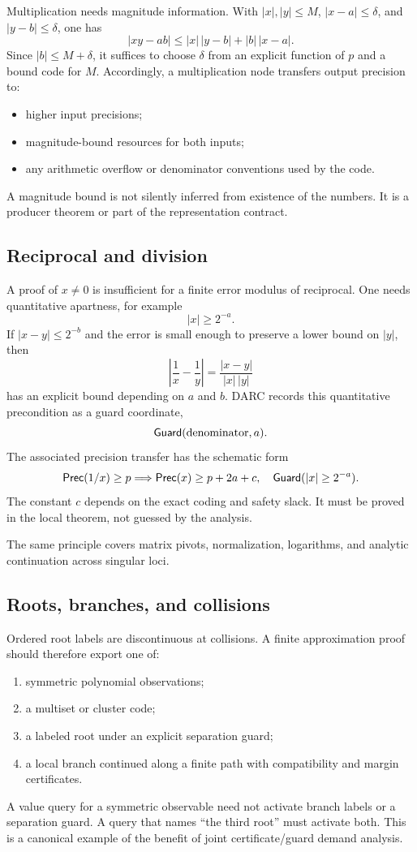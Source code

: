 Multiplication needs magnitude information.  With
\(|x|,|y|\le M\), \(|x-a|\le\delta\), and \(|y-b|\le\delta\), one has
\[
 |xy-ab|
 \le |x|\,|y-b|+|b|\,|x-a|.
\]
Since \(|b|\le M+\delta\), it suffices to choose \(\delta\) from an explicit
function of \(p\) and a bound code for \(M\).  Accordingly, a multiplication
node transfers output precision to:
\begin{itemize}
  \item higher input precisions;
  \item magnitude-bound resources for both inputs;
  \item any arithmetic overflow or denominator conventions used by the code.
\end{itemize}
A magnitude bound is not silently inferred from existence of the numbers.  It
is a producer theorem or part of the representation contract.

\subsection{Reciprocal and division}

A proof of \(x\ne0\) is insufficient for a finite error modulus of reciprocal.
One needs quantitative apartness, for example
\[
  |x|\ge 2^{-a}.
\]
If \(|x-y|\le 2^{-b}\) and the error is small enough to preserve a lower bound
on \(|y|\), then
\[
  \left|\frac1x-\frac1y\right|
  =\frac{|x-y|}{|x|\,|y|}
\]
has an explicit bound depending on \(a\) and \(b\).  DARC records this
quantitative precondition as a guard coordinate,
\[
  \mathsf{Guard}(\text{denominator},a).
\]
The associated precision transfer has the schematic form
\[
  \mathsf{Prec}(1/x)\ge p
  \Longrightarrow
  \mathsf{Prec}(x)\ge p+2a+c,
  \quad \mathsf{Guard}(|x|\ge2^{-a}).
\]
The constant \(c\) depends on the exact coding and safety slack.  It must be
proved in the local theorem, not guessed by the analysis.

The same principle covers matrix pivots, normalization, logarithms, and
analytic continuation across singular loci.

\subsection{Roots, branches, and collisions}

Ordered root labels are discontinuous at collisions.  A finite approximation
proof should therefore export one of:
\begin{enumerate}
  \item symmetric polynomial observations;
  \item a multiset or cluster code;
  \item a labeled root under an explicit separation guard;
  \item a local branch continued along a finite path with compatibility and
        margin certificates.
\end{enumerate}
A value query for a symmetric observable need not activate branch labels or a
separation guard.  A query that names ``the third root'' must activate both.
This is a canonical example of the benefit of joint certificate/guard demand
analysis.

